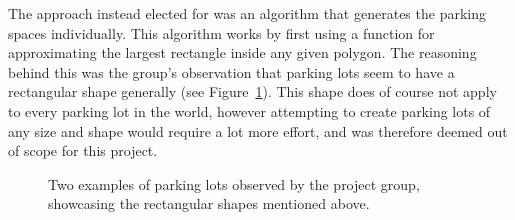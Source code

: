 The approach instead elected for was an algorithm that generates the parking spaces individually.
This algorithm works by first using a function for approximating the largest rectangle inside any given polygon. 
The reasoning behind this was the group's observation that parking lots seem to have a rectangular shape generally (see Figure~\ref{fig:parkings}).
This shape does of course not apply to every parking lot in the world, however attempting to create parking lots of any size and shape would require a lot more effort, and was therefore deemed out of scope for this project. 
\begin{figure}[H]
  \centering
  \begin{subfigure}[b]{0.56\textwidth}
  \end{subfigure}
  \quad
  \begin{subfigure}[b]{0.395\textwidth}
  \end{subfigure}
  \caption{Two examples of parking lots observed by the project group, showcasing the rectangular shapes mentioned above.}
  \label{fig:parkings}
\end{figure}
